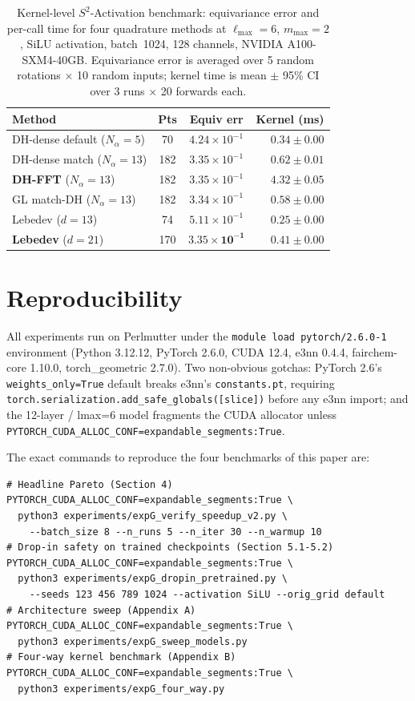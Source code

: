 \documentclass{article}
\begin{document}
\begin{table}[h]
  \centering
  \caption{Kernel-level $S^2$-Activation benchmark: equivariance
  error and per-call time for four quadrature methods at
  $\ell_{\max}{=}6$, $m_{\max}{=}2$, SiLU activation, batch~1024,
  128 channels, NVIDIA A100-SXM4-40GB. Equivariance error is averaged
  over 5 random rotations $\times$ 10 random inputs; kernel time is
  mean $\pm$ 95\% CI over 3 runs $\times$ 20 forwards each.}
  \label{tab:four_way}
  \small
  \begin{tabular}{lccr}
    \toprule
    Method & Pts & Equiv err & Kernel (ms) \\
    \midrule
    DH-dense default ($N_\alpha = 5$)   & 70  & $4.24\!\times\!10^{-1}$ & $0.34 \pm 0.00$ \\
    DH-dense match ($N_\alpha = 13$)    & 182 & $3.35\!\times\!10^{-1}$ & $0.62 \pm 0.01$ \\
    \textbf{DH-FFT} ($N_\alpha = 13$)   & 182 & $3.35\!\times\!10^{-1}$ & $\mathbf{4.32 \pm 0.05}$ \\
    GL match-DH ($N_\alpha = 13$)       & 182 & $3.34\!\times\!10^{-1}$ & $0.58 \pm 0.00$ \\
    Lebedev ($d = 13$)                  & 74  & $5.11\!\times\!10^{-1}$ & $0.25 \pm 0.00$ \\
    \textbf{Lebedev} ($d = 21$)         & 170 & $\mathbf{3.35\!\times\!10^{-1}}$ & $\mathbf{0.41 \pm 0.00}$ \\
    \bottomrule
  \end{tabular}
\end{table}

\section{Reproducibility}
\label{app:repro}

All experiments run on Perlmutter under the
\texttt{module load pytorch/2.6.0-1} environment (Python 3.12.12,
PyTorch 2.6.0, CUDA 12.4, e3nn 0.4.4, fairchem-core 1.10.0,
torch\_geometric 2.7.0). Two non-obvious gotchas: PyTorch 2.6's
\texttt{weights\_only=True} default breaks e3nn's
\texttt{constants.pt}, requiring
\texttt{torch.serialization.add\_safe\_globals([slice])} before any
e3nn import; and the 12-layer / lmax=6 model fragments the CUDA
allocator unless \texttt{PYTORCH\_CUDA\_ALLOC\_CONF=expandable\_segments:True}.

The exact commands to reproduce the four benchmarks of this paper
are:
\begin{verbatim}
# Headline Pareto (Section 4)
PYTORCH_CUDA_ALLOC_CONF=expandable_segments:True \
  python3 experiments/expG_verify_speedup_v2.py \
    --batch_size 8 --n_runs 5 --n_iter 30 --n_warmup 10
# Drop-in safety on trained checkpoints (Section 5.1-5.2)
PYTORCH_CUDA_ALLOC_CONF=expandable_segments:True \
  python3 experiments/expG_dropin_pretrained.py \
    --seeds 123 456 789 1024 --activation SiLU --orig_grid default
# Architecture sweep (Appendix A)
PYTORCH_CUDA_ALLOC_CONF=expandable_segments:True \
  python3 experiments/expG_sweep_models.py
# Four-way kernel benchmark (Appendix B)
PYTORCH_CUDA_ALLOC_CONF=expandable_segments:True \
  python3 experiments/expG_four_way.py
\end{verbatim}
\end{document}
